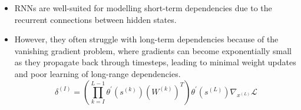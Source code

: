 \begin{itemize}

    \item RNNs are well-suited for modelling short-term dependencies due to the recurrent connections between hidden states.
    \item However, they often struggle with long-term dependencies because of the vanishing gradient problem, where gradients can become exponentially small as they propagate back through timesteps, leading to minimal weight updates and poor learning of long-range dependencies.
    \begin{equation}
        \delta^{(I)}=\left(\prod_{k=I}^{L-1}\theta^{\prime}(s^{(k)})(W^{(k)})^T\right)\theta^{\prime}(s^{(L)})\nabla_{x^{(L)}}\mathcal{L}
    \end{equation}
\end{itemize}


\begin{figure}[H]
    \centering
    

\end{figure}
\break
